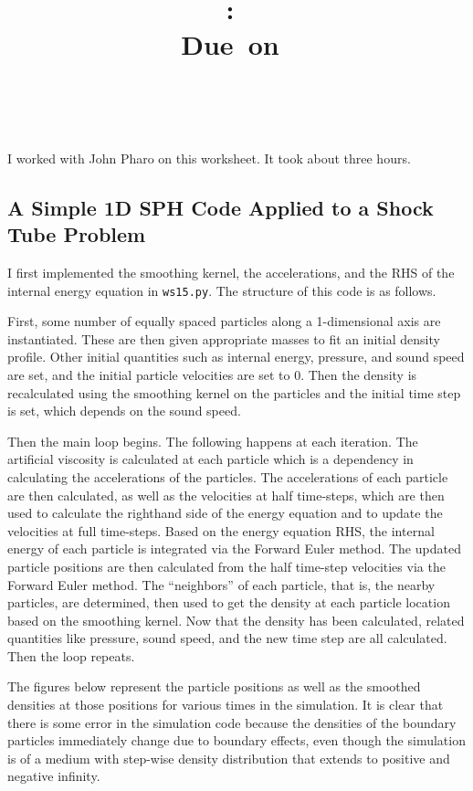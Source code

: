 \documentclass{article}
\title{\vspace{2in}\textmd{\textbf{\hmwkClass:\ \hmwkTitle}}\\\normalsize\vspace{0.1in}\small{Due\ on\ \hmwkDueDate}\\\vspace{0.1in}\large{\textit{\hmwkClassInstructor\ \hmwkClassTime}}\vspace{3in}}
\date{}
\author{\textbf{\hmwkAuthorName}}
\begin{document}
\begin{spacing}{1.1}

\newpage


I worked with John Pharo on this worksheet. It took about three hours.

\subsection{A Simple 1D SPH Code Applied to a Shock Tube Problem}

I first implemented the smoothing kernel, the accelerations, and the RHS of the internal energy equation in \texttt{ws15.py}. The structure of this code is as follows.

First, some number of equally spaced particles along a 1-dimensional axis are instantiated. These are then given appropriate masses to fit an initial density profile. Other initial quantities such as internal energy, pressure, and sound speed are set, and the initial particle velocities are set to 0. Then the density is recalculated using the smoothing kernel on the particles and the initial time step is set, which depends on the sound speed.

Then the main loop begins. The following happens at each iteration. The artificial viscosity is calculated at each particle which is a dependency in calculating the accelerations of the particles. The accelerations of each particle are then calculated, as well as the velocities at half time-steps, which are then used to calculate the righthand side of the energy equation and to update the velocities at full time-steps. Based on the energy equation RHS, the internal energy of each particle is integrated via the Forward Euler method. The updated particle positions are then calculated from the half time-step velocities via the Forward Euler method. The ``neighbors'' of each particle, that is, the nearby particles, are determined, then used to get the density at each particle location based on the smoothing kernel. Now that the density has been calculated, related quantities like pressure, sound speed, and the new time step are all calculated. Then the loop repeats.

The figures below represent the particle positions as well as the smoothed densities at those positions for various times in the simulation. It is clear that there is some error in the simulation code because the densities of the boundary particles immediately change due to boundary effects, even though the simulation is of a medium with step-wise density distribution that extends to positive and negative infinity.


\end{spacing}
\end{document}

